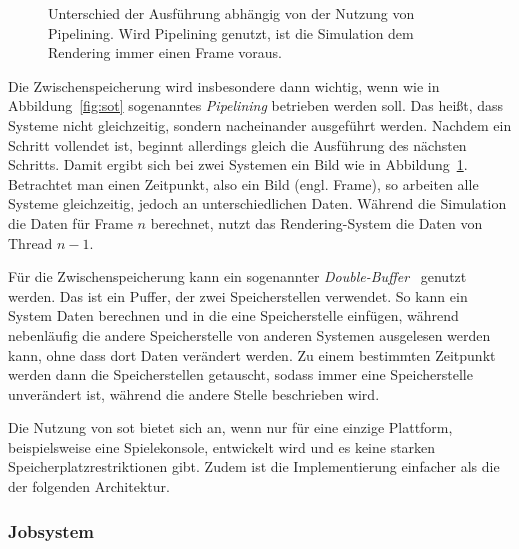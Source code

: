 \begin{figure}
	\caption[Unterschied der Ausführung abhängig von der Nutzung von Pipelining.]{Unterschied der Ausführung abhängig von der Nutzung von Pipelining. Wird Pipelining genutzt, ist die Simulation dem Rendering immer einen Frame voraus.}\label{fig:pipelining}
 \end{figure}

Die Zwischenspeicherung wird insbesondere dann wichtig, wenn wie in Abbildung~\ref{fig:sot} sogenanntes \emph{Pipelining} betrieben werden soll. Das heißt, dass Systeme nicht gleichzeitig, sondern nacheinander ausgeführt werden. Nachdem ein Schritt vollendet ist, beginnt allerdings gleich die Ausführung des nächsten Schritts. Damit ergibt sich bei zwei Systemen ein Bild wie in Abbildung~\ref{fig:pipelining}. Betrachtet man einen Zeitpunkt, also ein Bild (engl. Frame), so arbeiten alle Systeme gleichzeitig, jedoch an unterschiedlichen Daten. Während die Simulation die Daten für Frame $n$ berechnet, nutzt das Rendering-System die Daten von Thread $n-1$.

Für die Zwischenspeicherung kann ein sogenannter \emph{Double-Buffer}~\cite[S.~143]{Nystrom2015} genutzt werden. Das ist ein Puffer, der zwei Speicherstellen verwendet. So kann ein System Daten berechnen und in die eine Speicherstelle einfügen, während nebenläufig die andere Speicherstelle von anderen Systemen ausgelesen werden kann, ohne dass dort Daten verändert werden. Zu einem bestimmten Zeitpunkt werden dann die Speicherstellen getauscht, sodass immer eine Speicherstelle unverändert ist, während die andere Stelle beschrieben wird.

Die Nutzung von \ac{sot} bietet sich an, wenn nur für eine einzige Plattform, beispielsweise eine Spielekonsole, entwickelt wird und es keine starken Speicherplatzrestriktionen gibt. Zudem ist die Implementierung einfacher als die der folgenden Architektur.

\subsubsection{Jobsystem}\label{sec:gamesJobsystem}

